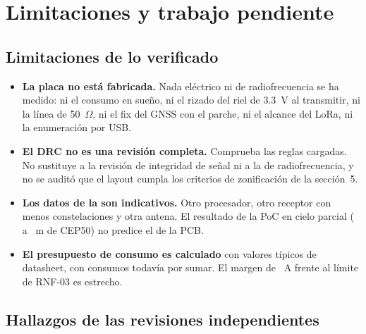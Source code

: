 \section{Limitaciones y trabajo pendiente}
\label{sec:limitaciones}

\subsection{Limitaciones de lo verificado}

\begin{itemize}
  \item \textbf{La placa no está fabricada.} Nada eléctrico ni de radiofrecuencia se ha medido: ni el consumo en sueño, ni el rizado del riel de 3.3~V al transmitir, ni la línea de 50~$\Omega$, ni el fix del GNSS con el parche, ni el alcance del LoRa, ni la enumeración por USB.
  \item \textbf{El DRC no es una revisión completa.} Comprueba las reglas cargadas. No sustituye a la revisión de integridad de señal ni a la de radiofrecuencia, y no se auditó que el layout cumpla los criterios de zonificación de la sección~5.
  \item \textbf{Los datos de la \pBoard{} son indicativos.} Otro procesador, otro receptor con menos constelaciones y otra antena. El resultado de la PoC en cielo parcial (\pCepLow{} a \pCepHigh~m de CEP50) no predice el de la PCB.
  \item \textbf{El presupuesto de consumo es calculado} con valores típicos de datasheet, con consumos todavía por sumar. El margen de \cMargin~\textmu A frente al límite de RNF-03 es estrecho.
\end{itemize}

\subsection{Hallazgos de las revisiones independientes}

